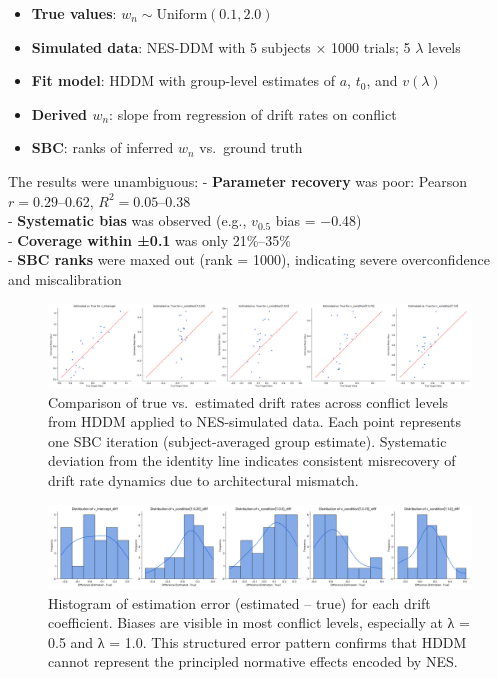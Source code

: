 \documentclass[
  11pt,
]{article}
\providecommand{\tightlist}{%
  \setlength{\itemsep}{0pt}\setlength{\parskip}{0pt}}
\begin{document}
\begin{itemize}
\tightlist
\item
  \textbf{True values}: \(w_n \sim \mathrm{Uniform}(0.1, 2.0)\)\\
\item
  \textbf{Simulated data}: NES-DDM with 5 subjects × 1000 trials; 5
  \(\lambda\) levels\\
\item
  \textbf{Fit model}: HDDM with group-level estimates of \(a\), \(t_0\),
  and \(v(\lambda)\)\\
\item
  \textbf{Derived \(w_n\)}: slope from regression of drift rates on
  conflict\\
\item
  \textbf{SBC}: ranks of inferred \(w_n\) vs.~ground truth
\end{itemize}

The results were unambiguous: - \textbf{Parameter recovery} was poor:
Pearson \(r = 0.29\)--0.62, \(R^2 = 0.05\)--0.38\\
- \textbf{Systematic bias} was observed (e.g., \(v_{0.5}\) bias =
−0.48)\\
- \textbf{Coverage within ±0.1} was only 21\%--35\%\\
- \textbf{SBC ranks} were maxed out (rank = 1000), indicating severe
overconfidence and miscalibration

\begin{figure}
\centering
\includegraphics[width=0.9\linewidth,height=\textheight,keepaspectratio]{figures/fortified_hddm_chart.png}
\caption{Comparison of true vs.~estimated drift rates across conflict
levels from HDDM applied to NES-simulated data. Each point represents
one SBC iteration (subject-averaged group estimate). Systematic
deviation from the identity line indicates consistent misrecovery of
drift rate dynamics due to architectural
mismatch.}\label{fig:fortified_chart}
\end{figure}

\begin{figure}
\centering
\includegraphics[width=0.8\linewidth,height=\textheight,keepaspectratio]{figures/fortified_hddm_histogram.png}
\caption{Histogram of estimation error (estimated -- true) for each
drift coefficient. Biases are visible in most conflict levels,
especially at λ = 0.5 and λ = 1.0. This structured error pattern
confirms that HDDM cannot represent the principled normative effects
encoded by NES.}\label{fig:hddm_hist}
\end{figure}
\end{document}
